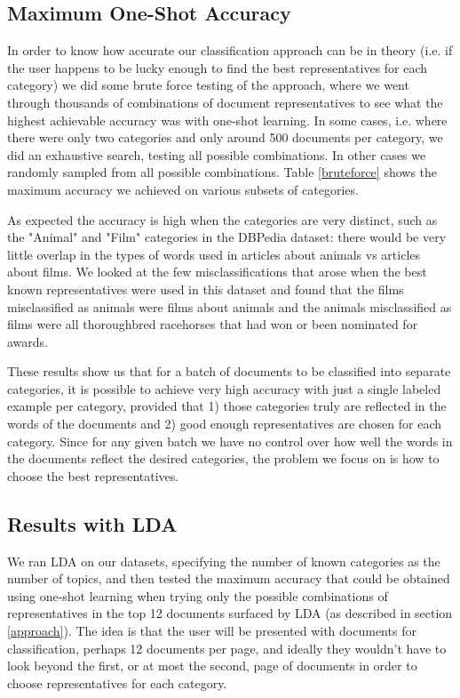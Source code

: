 \subsection{Maximum One-Shot Accuracy}
In order to know how accurate our classification approach can be in theory (i.e. if the user happens to be lucky enough to find the best representatives for each category) we did some brute force testing of the approach, where we went through thousands of combinations of document representatives to see what the highest achievable accuracy was with one-shot learning. In some cases, i.e. where there were only two categories and only around 500 documents per category, we did an exhaustive search, testing all possible combinations. In other cases we randomly sampled from all possible combinations. Table \ref{bruteforce} shows the maximum accuracy we achieved on various subsets of categories.

As expected the accuracy is high when the categories are very distinct, such as the "Animal" and "Film" categories in the DBPedia dataset: there would be very little overlap in the types of words used in articles about animals vs articles about films. We looked at the few misclassifications that arose when the best known representatives were used in this dataset and found that the films misclassified as animals were films about animals and the animals misclassified as films were all thoroughbred racehorses that had won or been nominated for awards.

These results show us that for a batch of documents to be classified into separate categories, it is possible to achieve very high accuracy with just a single labeled example per category, provided that 1) those categories truly are reflected in the words of the documents and 2) good enough representatives are chosen for each category. Since for any given batch we have no control over how well the words in the documents reflect the desired categories, the problem we focus on is how to choose the best representatives.

\subsection{Results with LDA}
We ran LDA on our datasets, specifying the number of known categories as the number of topics, and then tested the maximum accuracy that could be obtained using one-shot learning when trying only the possible combinations of representatives in the top 12 documents surfaced by LDA (as described in section \ref{approach}). The idea is that the user will be presented with documents for classification, perhaps 12 documents per page, and ideally they wouldn't have to look beyond the first, or at most the second, page of documents in order to choose representatives for each category.

